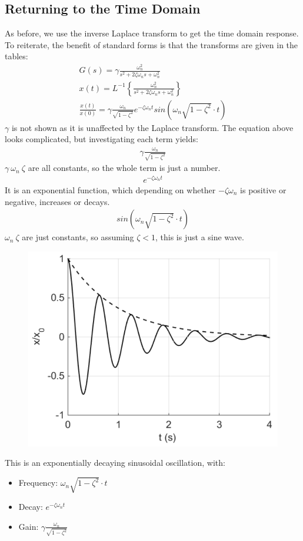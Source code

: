 \documentclass[class=report, crop=false, 12pt,a4paper]{standalone}
\begin{document}
\subsection{Returning to the Time Domain}
As before, we use the inverse Laplace transform to get the time domain response. To reiterate, the benefit of standard forms is that the transforms are given in the tables:
\begin{gather}
  G(s) = \gamma \frac{\omega_n^2}{s^2 + 2\zeta \omega_n s + \omega_n^2} \\
  x(t) = L^{-1} \left\{\frac{\omega_n^2}{s^2 + 2\zeta \omega_n s + \omega_n^2} \right\} \\
  \frac{x(t)}{x(0)} = \gamma \frac{\omega_n}{\sqrt{1-\zeta^2}}e^{-\zeta \omega_n t} sin(\omega_n \sqrt{1-\zeta^2}\cdot t)
\end{gather}
$\gamma$ is not shown as it is unaffected by the Laplace transform. The equation above looks complicated, but investigating each term yields:
\begin{gather}
  \gamma \frac{\omega_n}{\sqrt{1-\zeta^2}}
\end{gather}
$\gamma \ \omega_n \ \zeta$ are all constants, so the whole term is just a number.
\begin{gather}
  e^{-\zeta \omega_n t}
\end{gather}
It is an exponential function, which depending on whether $-\zeta \omega_n$ is positive or negative, increases or decays.
\begin{gather}
  sin(\omega_n \sqrt{1-\zeta^2}\cdot t)
\end{gather}
$\omega_n \ \zeta$ are just constants, so assuming $\zeta < 1$, this is just a sine wave.
\begin{figure}[H]
  \centering
  \includegraphics[width = 0.55 \textwidth]{../img/graphs8.PNG}
\end{figure}
This is an exponentially decaying sinusoidal oscillation, with:
\begin{itemize}
  \item Frequency: $\omega_n \sqrt{1-\zeta^2}\cdot t$
  \item Decay: $e^{-\zeta \omega_n t}$
  \item Gain: $\gamma \frac{\omega_n}{\sqrt{1-\zeta^2}}$
\end{itemize}
\end{document}
